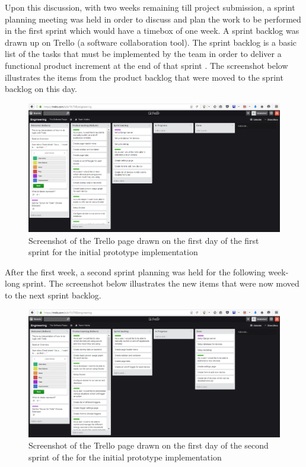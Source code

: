 \documentclass[10pt,twocolumn]{witseiepaper}
\begin{document}
	\vspace{-2mm}
	Upon this discussion, with two weeks remaining till project submission, a sprint planning meeting was held in order to discuss and plan the work to be performed in the first sprint which would have a timebox of one week. A sprint backlog was drawn up on Trello (a software collaboration tool). The sprint backlog is a basic list of the tasks that must be implemented by the team in order to deliver a functional product increment at the end of that sprint \cite{sprintbacklogdef}. 
	\newline
	\newline
	The screenshot below illustrates the items from the product backlog that were moved to the sprint backlog on this day. 
	\begin{figure}[H]
		\centering
		\includegraphics[width=\linewidth]{sprint_backlog_1}
		\caption{Screenshot of the Trello page drawn on the first day of the first sprint for the initial prototype implementation}
		\label{fig:sprint_backlog_1}
	\end{figure}
	
	After the first week, a second sprint planning was held for the following week-long sprint. The screenshot below illustrates the new items that were now moved to the next sprint backlog. 
	
	\begin{figure}[H]
		\centering
		\includegraphics[width=\linewidth]{sprint_backlog_2}
		\caption{Screenshot of the Trello page drawn on the first day of the second sprint of the for the initial prototype implementation}
		\label{fig:sprint_backlog_2}
	\end{figure}
	
\end{document}
